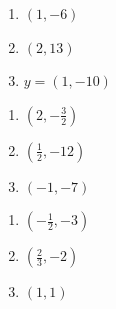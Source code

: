 \begin{multicols}{3}
\begin{enumerate}
\setcounter{enumi}{\value{HW}}

\item $(1,-6)$
\item $(2,13)$
\item $y = (1,-10)$

\setcounter{HW}{\value{enumi}}
\end{enumerate}
\end{multicols}

\begin{multicols}{3}
\begin{enumerate}
\setcounter{enumi}{\value{HW}}

\item $\left(2, -\frac{3}{2}\right)$
\item $\left(\frac{1}{2}, -12 \right)$
\item $(-1,-7)$

\setcounter{HW}{\value{enumi}}
\end{enumerate}
\end{multicols}

\begin{multicols}{3}
\begin{enumerate}
\setcounter{enumi}{\value{HW}}

\item $\left(-\frac{1}{2}, -3\right)$
\item $\left(\frac{2}{3}, -2 \right)$
\item $(1,1)$

\setcounter{HW}{\value{enumi}}
\end{enumerate}
\end{multicols}

